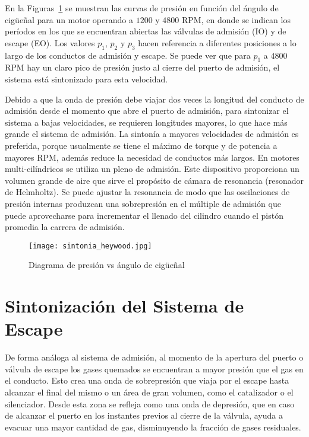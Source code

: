 En la Figuras~\ref{fig:sintonia_heywood} se muestran las curvas de presión en
función del ángulo de cigüeñal para un motor operando a $1200$ y $4800$ RPM, en
donde se indican los períodos en los que se encuentran abiertas las válvulas de
admisión (IO) y de escape (EO).
%
Los valores $p_{1}$, $p_{2}$ y $p_{3}$ hacen referencia a diferentes posiciones
a lo largo de los conductos de admisión y escape.
%
Se puede ver que para $p_{1}$ a $4800$ RPM hay un claro pico de presión justo al
cierre del puerto de admisión, el sistema está sintonizado para esta velocidad.

Debido a que la onda de presión debe viajar dos veces la longitud del conducto
de admisión desde el momento que abre el puerto de admisión, para sintonizar el
sistema a bajas velocidades, se requieren longitudes mayores, lo que hace más
grande el sistema de admisión.
%
La sintonía a mayores velocidades de admisión es preferida, porque usualmente se
tiene el máximo de torque y de potencia a mayores RPM, además reduce la
necesidad de conductos más largos.
%
En motores multi-cilíndricos se utiliza un pleno de admisión.
%
Este dispositivo proporciona un volumen grande de aire que sirve el propósito de
cámara de resonancia (resonador de Helmholtz).
%
Se puede ajustar la resonancia de modo que las oscilaciones de presión internas
produzcan una sobrepresión en el múltiple de admisión que puede aprovecharse
para incrementar el llenado del cilindro cuando el pistón promedia la carrera de
admisión.

\begin{figure}[h!]
  \centering
\texttt{[image: sintonia\_heywood.jpg]}
    \caption{Diagrama de presión vs ángulo de cigüeñal~\parencite{heywood}}\label{fig:sintonia_heywood}
\end{figure}

\section{Sintonización del Sistema de Escape}\label{cap2_sec_sintonia_escape}

De forma análoga al sistema de admisión, al momento de la apertura del puerto o
válvula de escape los gases quemados se encuentran a  mayor presión que el gas
en el conducto.
%
Esto crea una onda de sobrepresión que viaja por el escape hasta alcanzar el
final del mismo o un área de gran volumen, como el catalizador o el silenciador.
%
Desde esta zona se refleja como una onda de depresión, que en caso de alcanzar
el puerto en los instantes previos al cierre de la válvula, ayuda a evacuar una
mayor cantidad de gas, disminuyendo la fracción de gases residuales.

